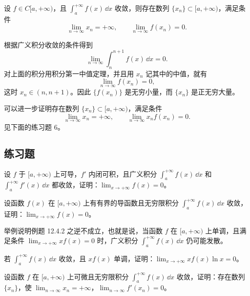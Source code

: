 \begin{xexample}[12.4.3]
设 $f\in C[a,+\infty)$，且 $\int_a^{+\infty}f(x)\,\dd x$ 收敛，则存在数列 $\{x_n\}\subset[a,+\infty)$，满足条件
\[
  \lim_{n\to\infty}x_n=+\infty,\qquad
  \lim_{n\to\infty}f(x_n)=0.
\]
\end{xexample}
\begin{xproof}
根据广义积分收敛的条件得到
\[
  \lim_{n\to\infty}\int_n^{n+1}f(x)\,\dd x=0.
\]
对上面的积分用积分第一中值定理，并且用 $x_n$ 记其中的中值，就有
\[
  \lim_{n\to\infty}f(x_n)=0,
\]
这时 $x_n\in(n,n+1)$。因此 $\{f(x_n)\}$ 是无穷小量，而 $\{x_n\}$ 是正无穷大量。
\end{xproof}

\begin{xremark}
可以进一步证明存在数列 $\{x_n\}\subset[a,+\infty)$，满足条件
\[
  \lim_{n\to\infty}x_n=+\infty,\qquad
  \lim_{n\to\infty}x_nf(x_n)=0.
\]
见下面的练习题 6。
\end{xremark}

\subsection{练习题}

\begin{xexercise}[1]
设 $f$ 于 $[a,+\infty)$ 上可导，$f'$ 内闭可积，且广义积分 $\int_a^{+\infty}f(x)\,\dd x$ 和 $\int_a^{+\infty}f'(x)\,\dd x$ 都收敛，证明：$\lim_{x\to+\infty}f(x)=0$。
\end{xexercise}

\begin{xexercise}[2]
设函数 $f(x)$ 在 $[a,+\infty)$ 上有有界的导函数且无穷限积分 $\int_a^{+\infty}f(x)\,\dd x$ 收敛，证明：$\lim_{x\to+\infty}f(x)=0$。
\end{xexercise}

\begin{xexercise}[3]
举例说明例题 12.4.2 之逆不成立，也就是说，当函数 $f$ 在 $[a,+\infty)$ 上单调，且满足条件 $\lim_{x\to+\infty}xf(x)=0$ 时，广义积分 $\int_a^{+\infty}f(x)\,\dd x$ 仍可能发散。
\end{xexercise}

\begin{xexercise}[4]
若 $\int_a^{+\infty}f(x)\,\dd x$ 收敛，且 $xf(x)$ 单调，证明：$\lim_{x\to+\infty}xf(x)\ln x=0$。
\end{xexercise}

\begin{xexercise}[5]
设函数 $f$ 在 $[a,+\infty)$ 上可微且无穷限积分 $\int_a^{+\infty}f(x)\,\dd x$ 收敛，证明：存在数列 $\{x_n\}$，使 $\lim_{n\to\infty}x_n=+\infty$，$\lim_{n\to\infty}f'(x_n)=0$。
\end{xexercise}

